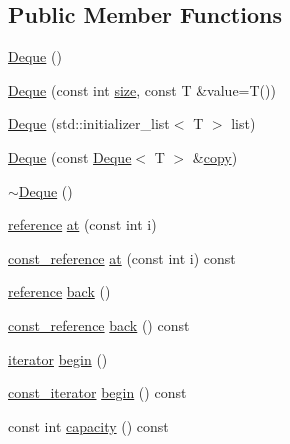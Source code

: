 \subsection*{Public Member Functions}
\begin{DoxyCompactItemize}
\item 
\hyperlink{classprism_1_1_deque_ae8fcffd4a0cf7dba0e33a6983641efc2}{Deque} ()
\item 
\hyperlink{classprism_1_1_deque_ac73ef5f071e6dfddf1f5e8a123752d3e}{Deque} (const int \hyperlink{classprism_1_1_deque_a38e141650506c5b320093c5bd5486a8c}{size}, const T \&value=T())
\item 
\hyperlink{classprism_1_1_deque_aa8c11433e26904fb8a46b912ea6617cf}{Deque} (std\+::initializer\+\_\+list$<$ T $>$ list)
\item 
\hyperlink{classprism_1_1_deque_abaa7ff51e27ef7acb0ca1afe523e7976}{Deque} (const \hyperlink{classprism_1_1_deque}{Deque}$<$ T $>$ \&\hyperlink{namespaceprism_ae776f4cd825f79e7af1cf6ee1d90a209}{copy})
\item 
\hyperlink{classprism_1_1_deque_a2a06b6247712d843c6f23df8ba807ca7}{$\sim$\+Deque} ()
\item 
\hyperlink{classprism_1_1_deque_a93d8792e719ca205ce1b9ed5d8207c1d}{reference} \hyperlink{classprism_1_1_deque_a65c32d16eb2134a702c753f105de9d97}{at} (const int i)
\item 
\hyperlink{classprism_1_1_deque_a8fcabfe6976606b91b4abef0e0353584}{const\+\_\+reference} \hyperlink{classprism_1_1_deque_a4fc2c88d257f52f95232639808f41c36}{at} (const int i) const 
\item 
\hyperlink{classprism_1_1_deque_a93d8792e719ca205ce1b9ed5d8207c1d}{reference} \hyperlink{classprism_1_1_deque_a3b2d94aaa26559418ca55084b2ebfe41}{back} ()
\item 
\hyperlink{classprism_1_1_deque_a8fcabfe6976606b91b4abef0e0353584}{const\+\_\+reference} \hyperlink{classprism_1_1_deque_a8bac1935776aec89723775807f022ef1}{back} () const 
\item 
\hyperlink{classprism_1_1_deque_af6fbdfa6e826f7f71b29f4d3cfb72ed1}{iterator} \hyperlink{classprism_1_1_deque_a8d0711ff8a7e810cad9b535c79b7f9b7}{begin} ()
\item 
\hyperlink{classprism_1_1_deque_afc2f71fd5b01e963e093f64cc4da94ec}{const\+\_\+iterator} \hyperlink{classprism_1_1_deque_afbb49ba1e2b3e2d59317625675f73106}{begin} () const 
\item 
const int \hyperlink{classprism_1_1_deque_ad787f6064309077863076b7a3c97d1c4}{capacity} () const 
\item 

\end{DoxyCompactItemize}
